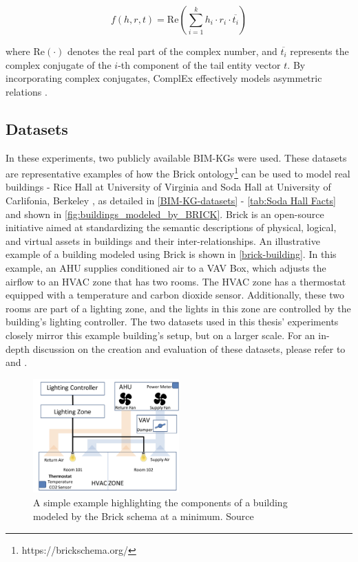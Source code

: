 \begin{enumerate}
    \begin{equation}
    f(h, r, t) = \text{Re}\left(\sum_{i=1}^{k} h_i \cdot r_i \cdot \overline{t_i}\right)
    \end{equation}
    
    where \( \text{Re}(\cdot) \) denotes the real part of the complex number, and \( \overline{t_i} \) represents the complex conjugate of the \( i \)-th component of the tail entity vector \( t \). By incorporating complex conjugates, ComplEx effectively models asymmetric relations \cite{}.
\end{enumerate}

\subsection{Datasets}
In these experiments, two publicly available \acp{BIM-KG} were used. These datasets are representative examples of how the Brick ontology\footnote{https://brickschema.org/} can be used to model real buildings - Rice Hall at University of Virginia \citep{Balaji2016Brick:Buildings} and Soda Hall at University of Carlifonia, Berkeley \citep{Balaji2016Brick:Buildings}, as detailed in \autoref{BIM-KG-datasets} - \autoref{tab:Soda Hall Facts} and shown in \autoref{fig:buildings_modeled_by_BRICK}. Brick is an open-source initiative aimed at standardizing the semantic descriptions of physical, logical, and virtual assets in buildings and their inter-relationships. An illustrative example of a building modeled using Brick is shown in \autoref{brick-building}. In this example, an \ac{AHU} supplies conditioned air to a \ac{VAV} Box, which adjusts the airflow to an \ac{HVAC} zone that has two rooms. The \ac{HVAC} zone has a thermostat equipped with a temperature and carbon dioxide sensor. Additionally, these two rooms are part of a lighting zone, and the lights in this zone are controlled by the building's lighting controller. The two datasets used in this thesis' experiments closely mirror this example building's setup, but on a larger scale. For an in-depth discussion on the creation and evaluation of these datasets, please refer to \cite{Balaji2016Brick:Buildings} and \cite{Balaji2018BrickApplications}.

\begin{figure}[t]
        \centering      \includegraphics[width=0.5\textwidth]{figures/brick-building.png}
        \caption{A simple example highlighting the components of a building modeled by the Brick schema at a minimum. Source \citep{Balaji2016Brick:Buildings}} \label{brick-building}
\end{figure}

